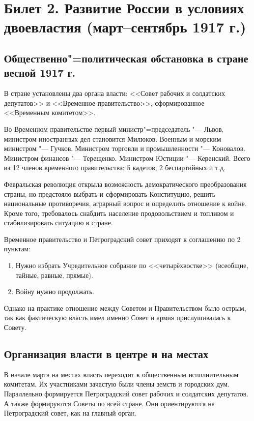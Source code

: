 \section{Билет 2. Развитие России в условиях двоевластия (март--сентябрь 1917 г.)}

\subsection{Общественно"=политическая обстановка в стране весной 1917 г.}

В стране установлены два органа власти: <<Совет рабочих и солдатских депутатов>> и <<Временное правительство>>, сформированное <<Временным комитетом>>.

Во Временном правительстве первый министр"=председатель "--- Львов, министром иностранных дел становится Милюков. Военным и морским министром "--- Гучков. Министром торговли и промышленности "--- Коновалов. Министром финансов "--- Терещенко. Министром Юстиции "--- Керенский. Всего из 12 членов временного правительства: 5 кадетов, 2 беспартийных и т.д.

Февральская революция открыла возможность демократического преобразования страны, но предстояло выбрать и сформировать Конституцию, решить национальные противоречия, аграрный вопрос и определить отношение к войне. Кроме того, требовалось снабдить население продовольствием и топливом и стабилизировать ситуацию в стране.

Временное правительство и Петроградский совет приходят к соглашению по 2 пунктам:

\begin{enumerate}
    \item Нужно избрать Учредительное собрание по <<четырёхвостке>> (всеобщие, тайные, равные, прямые).
    \item Войну нужно продолжать.
\end{enumerate}
Однако на практике отношение между Советом и Правительством было острым, так как фактическую власть имел именно Совет и армия прислушивалась к Совету.



\subsection{Организация власти в центре и на местах}

В начале марта на местах власть переходит к общественным исполнительным комитетам. Их участниками зачастую были члены земств и городских дум. 
Параллельно формируется Петроградский совет рабочих и солдатских депутатов. А также формируются Советы по всей стране. Они ориентируются на Петроградский совет, как на главный орган.



